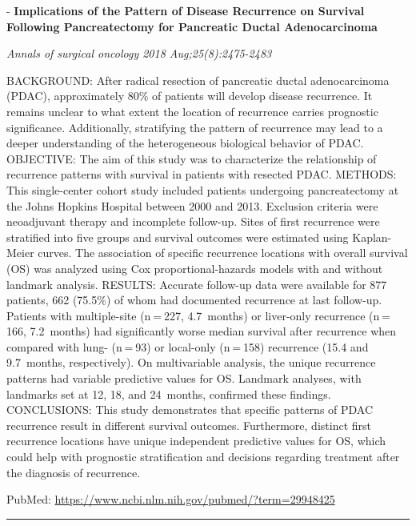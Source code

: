 \documentclass[]{article}
\begin{document}
 - \textbf{Implications of the Pattern of Disease Recurrence on Survival
Following Pancreatectomy for Pancreatic Ductal Adenocarcinoma}

\emph{Annals of surgical oncology 2018 Aug;25(8):2475-2483}

BACKGROUND: After radical resection of pancreatic ductal adenocarcinoma
(PDAC), approximately 80\% of patients will develop disease recurrence.
It remains unclear to what extent the location of recurrence carries
prognostic significance. Additionally, stratifying the pattern of
recurrence may lead to a deeper understanding of the heterogeneous
biological behavior of PDAC. OBJECTIVE: The aim of this study was to
characterize the relationship of recurrence patterns with survival in
patients with resected PDAC. METHODS: This single-center cohort study
included patients undergoing pancreatectomy at the Johns Hopkins
Hospital between 2000 and 2013. Exclusion criteria were neoadjuvant
therapy and incomplete follow-up. Sites of first recurrence were
stratified into five groups and survival outcomes were estimated using
Kaplan-Meier curves. The association of specific recurrence locations
with overall survival (OS) was analyzed using Cox proportional-hazards
models with and without landmark analysis. RESULTS: Accurate follow-up
data were available for 877 patients, 662 (75.5\%) of whom had
documented recurrence at last follow-up. Patients with multiple-site
(n = 227, 4.7~months) or liver-only recurrence (n = 166, 7.2~months) had
significantly worse median survival after recurrence when compared with
lung- (n = 93) or local-only (n = 158) recurrence (15.4 and 9.7~months,
respectively). On multivariable analysis, the unique recurrence patterns
had variable predictive values for OS. Landmark analyses, with landmarks
set at 12, 18, and 24~months, confirmed these findings. CONCLUSIONS:
This study demonstrates that specific patterns of PDAC recurrence result
in different survival outcomes. Furthermore, distinct first recurrence
locations have unique independent predictive values for OS, which could
help with prognostic stratification and decisions regarding treatment
after the diagnosis of recurrence.

PubMed: \url{https://www.ncbi.nlm.nih.gov/pubmed/?term=29948425}

{}

{}

\begin{center}\rule{0.5\linewidth}{\linethickness}\end{center}
\end{document}

